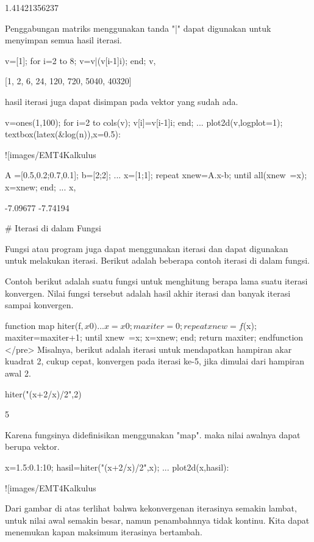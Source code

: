 \documentclass{article}
\begin{document}
    1.41421356237

Penggabungan matriks menggunakan tanda "|" dapat digunakan untuk menyimpan semua hasil
iterasi.


\>v=[1]; for i=2 to 8; v=v|(v[i-1]\*i); end; v,


    [1,  2,  6,  24,  120,  720,  5040,  40320]

hasil iterasi juga dapat disimpan pada vektor yang sudah ada.


\>v=ones(1,100); for i=2 to cols(v); v[i]=v[i-1]\*i; end; ...  
\>   plot2d(v,logplot=1); textbox(latex(&log(n)),x=0.5):


![images/EMT4Kalkulus%

\>A =[0.5,0.2;0.7,0.1]; b=[2;2]; ...  
\>   x=[1;1]; repeat xnew=A.x-b; until all(xnew~=x); x=xnew; end; ...  
\>   x,


         -7.09677 
         -7.74194 

# Iterasi di dalam Fungsi

Fungsi atau program juga dapat menggunakan iterasi dan dapat digunakan untuk melakukan iterasi. Berikut adalah beberapa contoh
iterasi di dalam fungsi.


Contoh berikut adalah suatu fungsi untuk menghitung berapa lama suatu iterasi konvergen. Nilai fungsi tersebut adalah hasil akhir
iterasi dan banyak iterasi sampai konvergen.


\>function map hiter(f$,x0) ...


    x=x0;
    maxiter=0;
    repeat
      xnew=f$(x);
      maxiter=maxiter+1;
      until xnew~=x;
      x=xnew;
    end;
    return maxiter;
    endfunction
</pre>
Misalnya, berikut adalah iterasi untuk mendapatkan hampiran akar kuadrat 2, cukup cepat,
konvergen pada iterasi ke-5, jika dimulai dari hampiran awal 2.


\>hiter("(x+2/x)/2",2)


    5

Karena fungsinya didefinisikan menggunakan "map". maka nilai awalnya dapat berupa vektor.


\>x=1.5:0.1:10; hasil=hiter("(x+2/x)/2",x); ...  
\>     plot2d(x,hasil):


![images/EMT4Kalkulus%

Dari gambar di atas terlihat bahwa kekonvergenan iterasinya semakin lambat, untuk nilai awal
semakin besar, namun penambahnnya tidak kontinu. Kita dapat menemukan kapan maksimum
iterasinya bertambah.
\end{document}
